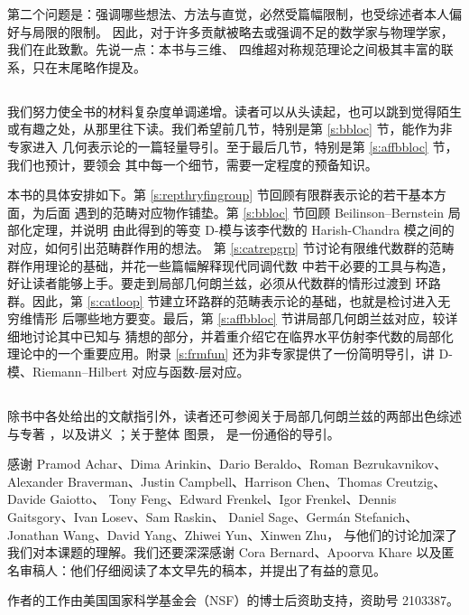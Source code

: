 第二个问题是：强调哪些想法、方法与直觉，必然受篇幅限制，也受综述者本人偏好与局限的限制。
因此，对于许多贡献被略去或强调不足的数学家与物理学家，我们在此致歉。先说一点：本书与三维、
四维超对称规范理论之间极其丰富的联系，只在末尾略作提及。

\subsection{} 我们努力使全书的材料复杂度单调递增。读者可以从头读起，也可以跳到觉得陌生
或有趣之处，从那里往下读。我们希望前几节，特别是第 \ref{s:bbloc} 节，能作为非专家进入
几何表示论的一篇轻量导引。至于最后几节，特别是第 \ref{s:affbbloc} 节，我们也预计，要领会
其中每一个细节，需要一定程度的预备知识。

本书的具体安排如下。第 \ref{s:repthryfingroup} 节回顾有限群表示论的若干基本方面，为后面
遇到的范畴对应物作铺垫。第 \ref{s:bbloc} 节回顾 Beilinson--Bernstein 局部化定理，并说明
由此得到的等变 D-模与该李代数的 Harish-Chandra 模之间的对应，如何引出范畴群作用的想法。
第 \ref{s:catrepgrp} 节讨论有限维代数群的范畴群作用理论的基础，并花一些篇幅解释现代同调代数
中若干必要的工具与构造，好让读者能够上手。要走到局部几何朗兰兹，必须从代数群的情形过渡到
环路群。因此，第 \ref{s:catloop} 节建立环路群的范畴表示论的基础，也就是检讨进入无穷维情形
后哪些地方要变。最后，第 \ref{s:affbbloc} 节讲局部几何朗兰兹对应，较详细地讨论其中已知与
猜想的部分，并着重介绍它在临界水平仿射李代数的局部化理论中的一个重要应用。附录
\ref{s:frmfun} 还为非专家提供了一份简明导引，讲 D-模、Riemann--Hilbert 对应与函数-层对应。

\subsection{} 除书中各处给出的文献指引外，读者还可参阅关于局部几何朗兰兹的两部出色综述
\cite{frenkellocalnotes} 与专著 \cite{frenkelloop}，以及讲义 \cite{paris-notes}；关于整体
图景，\cite{frenkelglobalnotes} 是一份通俗的导引。

\vspace{.5cm}

 感谢 Pramod Achar、Dima Arinkin、Dario Beraldo、Roman Bezrukavnikov、
Alexander Braverman、Justin Campbell、Harrison Chen、Thomas Creutzig、Davide Gaiotto、
Tony Feng、Edward Frenkel、Igor Frenkel、Dennis Gaitsgory、Ivan Losev、Sam Raskin、
Daniel Sage、Germ\'an Stefanich、Jonathan Wang、David Yang、Zhiwei Yun、Xinwen Zhu，
与他们的讨论加深了我们对本课题的理解。我们还要深深感谢 Cora Bernard、Apoorva Khare
以及匿名审稿人：他们仔细阅读了本文早先的稿本，并提出了有益的意见。

作者的工作由美国国家科学基金会（NSF）的博士后资助支持，资助号 2103387。
